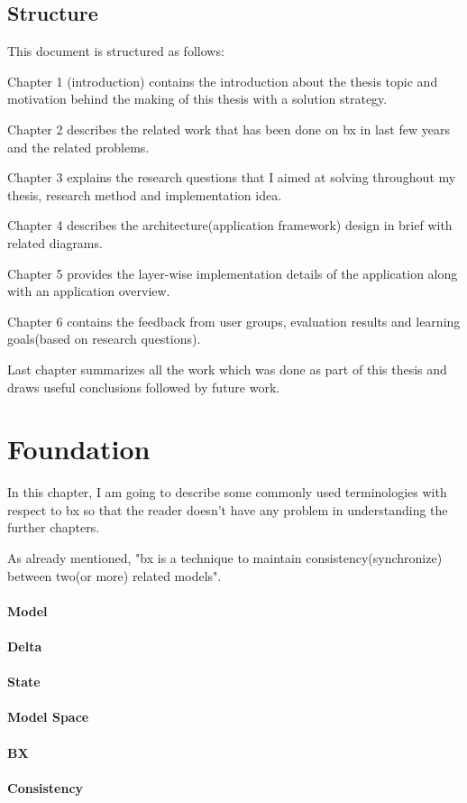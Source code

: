 \subsection{Structure}\label{subsec:structure}
This document is structured as follows: 

Chapter 1 (introduction) contains the introduction about the thesis topic and
motivation behind the making of this thesis with a solution strategy.

Chapter 2 describes the related work that has been done on bx in last few years and the related problems.

Chapter 3 explains the research questions that I aimed at solving throughout my thesis, research method and implementation idea.

Chapter 4 describes the architecture(application framework) design in brief with related diagrams.

Chapter 5 provides the layer-wise implementation details of the application along with an application overview.

Chapter 6 contains the feedback from user groups, evaluation results and learning goals(based on research questions).

Last chapter summarizes all the work which was done as part of this thesis and draws useful conclusions followed by future work.

\section{Foundation}\label{sec:foundation}
In this chapter, I am going to describe some commonly used terminologies with respect to bx so that the reader doesn't have any problem in understanding the further chapters.

As already mentioned, "bx is a technique to maintain consistency(synchronize) between two(or more) related models".

\paragraph{Model}
\paragraph{Delta}
\paragraph{State}
\paragraph{Model Space}
\paragraph{BX}
\paragraph{Consistency}




